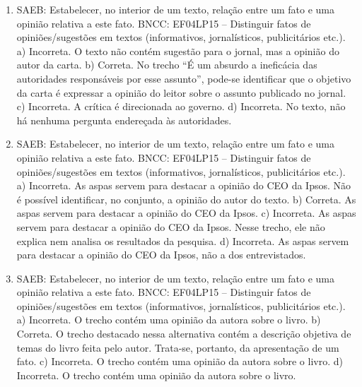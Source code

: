 \begin{enumerate}
\item
SAEB: Estabelecer, no interior de um texto, relação entre um fato e
uma opinião relativa a este fato.
BNCC: EF04LP15 -- Distinguir fatos de opiniões/sugestões em textos
(informativos, jornalísticos, publicitários etc.).
a)  Incorreta. O texto não contém sugestão para o jornal, mas a
opinião do autor da carta.
b)  Correta. No trecho ``É um absurdo a ineficácia das autoridades
responsáveis por esse assunto'', pode-se identificar que o objetivo da
carta é expressar a opinião do leitor sobre o assunto publicado no jornal.
c)  Incorreta. A crítica é direcionada ao governo.
d)  Incorreta. No texto, não há nenhuma pergunta endereçada às autoridades.

\item
SAEB: Estabelecer, no interior de um texto, relação entre um fato e
uma opinião relativa a este fato.
BNCC: EF04LP15 -- Distinguir fatos de opiniões/sugestões em textos
(informativos, jornalísticos, publicitários etc.).
a) Incorreta. As aspas servem para destacar a opinião do CEO da Ipsos. 
Não é possível identificar, no conjunto, a opinião do autor do texto.  
b) Correta. As aspas servem para destacar a opinião do CEO da Ipsos.
c) Incorreta. As aspas servem para destacar a opinião do CEO da Ipsos.
Nesse trecho, ele não explica nem analisa os resultados da pesquisa.
d) Incorreta. As aspas servem para destacar a opinião do CEO da Ipsos, não
a dos entrevistados.

\item
SAEB: Estabelecer, no interior de um texto, relação entre um fato e
uma opinião relativa a este fato.
BNCC: EF04LP15 -- Distinguir fatos de opiniões/sugestões em textos
(informativos, jornalísticos, publicitários etc.).
a) Incorreta. O trecho contém uma opinião da autora sobre o livro.
b) Correta. O trecho destacado nessa alternativa contém a descrição
objetiva de temas do livro feita pelo autor. Trata-se, portanto, da apresentação de 
um fato. 
c) Incorreta. O trecho contém uma opinião da autora sobre o livro.
d) Incorreta. O trecho contém uma opinião da autora sobre o livro.
\end{enumerate}


